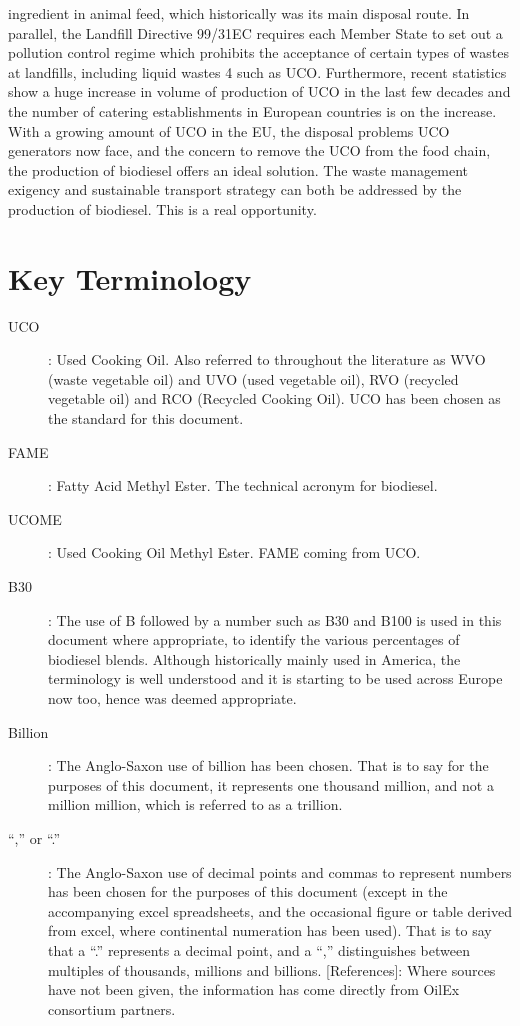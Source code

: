 \documentclass[11pt,fleqn]{book} %
\begin{document}
ingredient in animal feed, which historically was its main disposal route. In parallel, the
Landfill Directive 99/31EC requires each Member State to set out a pollution control regime
which prohibits the acceptance of certain types of wastes at landfills, including liquid wastes
4
such as UCO. Furthermore, recent statistics show a huge increase in volume of production of
UCO in the last few decades and the number of catering establishments in European
countries is on the increase.
With a growing amount of UCO in the EU, the disposal problems UCO generators now face,
and the concern to remove the UCO from the food chain, the production of biodiesel offers
an ideal solution. The waste management exigency and sustainable transport strategy can
both be addressed by the production of biodiesel. This is a real opportunity.



\section{Key Terminology}
\begin{description}
	\item[UCO]: Used Cooking Oil. Also referred to throughout the literature as WVO (waste vegetable
oil) and UVO (used vegetable oil), RVO (recycled vegetable oil) and RCO (Recycled Cooking
Oil). UCO has been chosen as the standard for this document.
    \item[FAME]: Fatty Acid Methyl Ester. The technical acronym for biodiesel.
    \item[UCOME]: Used Cooking Oil Methyl Ester. FAME coming from UCO.
	\item[B30]: The use of B followed by a number such as B30 and B100 is used in this document
where appropriate, to identify the various percentages of biodiesel blends. Although
historically mainly used in America, the terminology is well understood and it is starting to be
used across Europe now too, hence was deemed appropriate.
    \item[Billion]: The Anglo-Saxon use of billion has been chosen. That is to say for the purposes of
this document, it represents one thousand million, and not a million million, which is referred
to as a trillion.
    \item[“,” or “.”]: The Anglo-Saxon use of decimal points and commas to represent numbers has
been chosen for the purposes of this document (except in the accompanying excel
spreadsheets, and the occasional figure or table derived from excel, where continental
numeration has been used). That is to say that a “.” represents a decimal point, and a “,”
distinguishes between multiples of thousands, millions and billions.
[References]: Where sources have not been given, the information has come directly from
OilEx consortium partners.
    \end{description}
\end{document}

